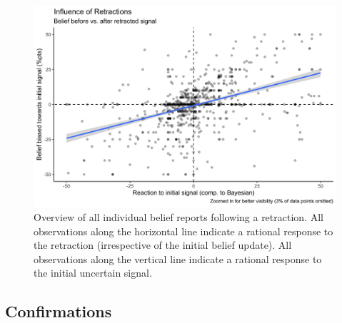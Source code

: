 \documentclass{article}
\begin{document}

\vspace{2cm}

\begin{figure}[!ht]
    \centering
    \includegraphics[width=12cm]{Fig/02_fig_retract_diff_cont_noout.jpg}
    \caption{Overview of all individual belief reports following a retraction. All observations along the horizontal line indicate a rational response to the retraction (irrespective of the initial belief update). All observations along the vertical line indicate a rational response to the initial uncertain signal.}
    \label{fig:belief_diff_retract}
\end{figure}













\newpage
\subsection{Confirmations}
\end{document}
